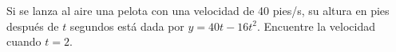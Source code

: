 \item Si se lanza al aire una pelota con una velocidad de 40 pies/s, su altura en pies después de $t$ segundos está dada por $y = 40t - 16t^2$. Encuentre la velocidad cuando $t = 2$.
